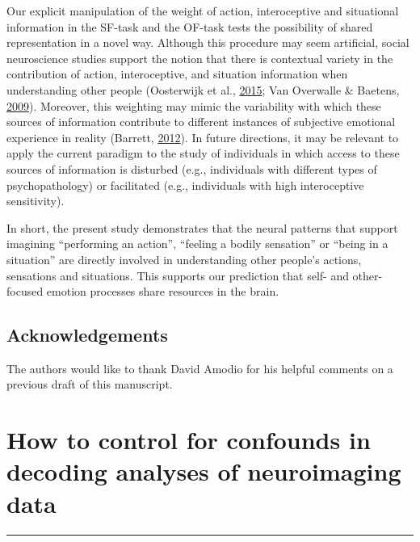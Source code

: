 \documentclass[12pt,american,a4paper,oneside,]{memoir} %
\begin{document}
Our explicit manipulation of the weight of action, interoceptive and situational information in the SF-task and the OF-task tests the possibility of shared representation in a novel way. Although this procedure may seem artificial, social neuroscience studies support the notion that there is contextual variety in the contribution of action, interoceptive, and situation information when understanding other people (Oosterwijk et al., \protect\hyperlink{ref-oosterwijk2015concepts}{2015}; Van Overwalle \& Baetens, \protect\hyperlink{ref-van2009understanding}{2009}). Moreover, this weighting may mimic the variability with which these sources of information contribute to different instances of subjective emotional experience in reality (Barrett, \protect\hyperlink{ref-barrett2012emotions}{2012}). In future directions, it may be relevant to apply the current paradigm to the study of individuals in which access to these sources of information is disturbed (e.g., individuals with different types of psychopathology) or facilitated (e.g., individuals with high interoceptive sensitivity).

In short, the present study demonstrates that the neural patterns that support imagining ``performing an action'', ``feeling a bodily sensation'' or ``being in a situation'' are directly involved in understanding other people's actions, sensations and situations. This supports our prediction that self- and other-focused emotion processes share resources in the brain.

\hypertarget{shared-states-acknowledgements}{%
\section{Acknowledgements}\label{shared-states-acknowledgements}}

The authors would like to thank David Amodio for his helpful comments on a previous draft of this manuscript.

\hypertarget{confounds-decoding}{%
\chapter{How to control for confounds in decoding analyses of neuroimaging data}\label{confounds-decoding}}


\vspace*{\fill}

\begin{center}\rule{0.5\linewidth}{0.5pt}\end{center}
\end{document}
